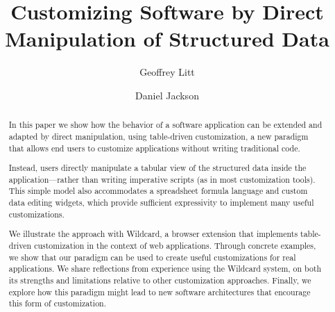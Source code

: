 \documentclass[sigplan,10pt,anonymous,review]{acmart}
\begin{document}
\title{Customizing Software by Direct Manipulation of Structured Data}


\author{Geoffrey Litt}

\author{Daniel Jackson}


\begin{abstract}
  In this paper we show how the behavior of a software application can
  be extended and adapted by direct manipulation, using table-driven
  customization, a new paradigm that allows end users to customize
  applications without writing traditional code.

  Instead, users directly manipulate a tabular view of the structured
  data inside the application---rather than writing imperative scripts
  (as in most customization tools). This simple model also accommodates
  a spreadsheet formula language and custom data editing widgets, which
  provide sufficient expressivity to implement many useful
  customizations.

  We illustrate the approach with Wildcard, a browser extension that
  implements table-driven customization in the context of web
  applications. Through concrete examples, we show that our paradigm can
  be used to create useful customizations for real applications. We
  share reflections from experience using the Wildcard system, on both
  its strengths and limitations relative to other customization
  approaches. Finally, we explore how this paradigm might lead to new
  software architectures that encourage this form of customization.
\end{abstract}
\end{document}
